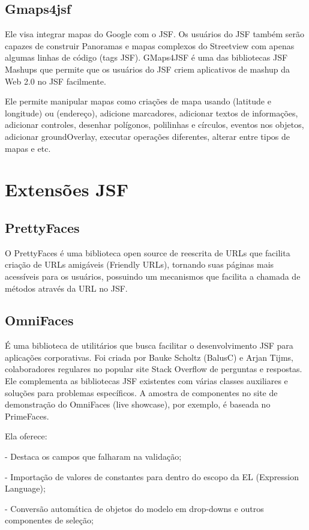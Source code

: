 \documentclass[12pt,a4paper]{article}
\begin{document}
\subsection{Gmaps4jsf}
Ele visa integrar mapas do Google com o JSF. Os usuários do JSF também serão capazes de construir Panoramas e mapas complexos do Streetview com apenas algumas linhas de código (tags JSF). GMaps4JSF é uma das bibliotecas JSF Mashups que permite que os usuários do JSF criem aplicativos de mashup da Web 2.0 no JSF facilmente.

Ele permite manipular mapas como criações de mapa usando (latitude e longitude) ou (endereço), adicione marcadores, adicionar textos de informações, adicionar controles, desenhar polígonos, polilinhas e círculos, eventos nos objetos, adicionar groundOverlay, executar operações diferentes, alterar entre tipos de mapas e etc.

\section{Extensões JSF}
\subsection{PrettyFaces}
O PrettyFaces é uma biblioteca open source de reescrita de URLs que facilita criação de URLs amigáveis (Friendly URLs), tornando suas páginas mais acessíveis para os usuários, possuindo um mecanismos que facilita a chamada de métodos através da URL no JSF.

\subsection{OmniFaces}
É uma biblioteca de utilitários que busca facilitar o desenvolvimento JSF para aplicações corporativas. Foi criada por Bauke Scholtz (BalusC) e Arjan Tijms, colaboradores regulares no popular site Stack Overflow de perguntas e respostas. Ele complementa as bibliotecas JSF existentes com várias classes auxiliares e soluções para problemas específicos. A amostra de componentes no site de demonstração do OmniFaces (live showcase), por exemplo, é baseada no PrimeFaces. 

Ela oferece:

- Destaca os campos que falharam na validação;

- Importação de valores de constantes para dentro do escopo da EL (Expression Language);

- Conversão automática de objetos do modelo em drop-downs e outros componentes de seleção;
\end{document}
